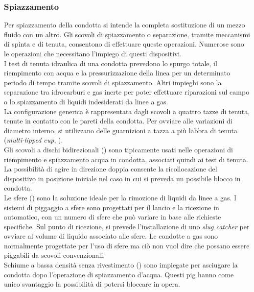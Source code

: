 \subsubsection{Spiazzamento}
Per spiazzamento della condotta si intende la completa sostituzione di un mezzo fluido con un altro. Gli scovoli di spiazzamento o separazione, tramite meccanismi di spinta e di tenuta, consentono di effettuare queste operazioni. Numerose sono le operazioni che necessitano l'impiego di questi dispositivi.\\
I test di tenuta idraulica di una condotta prevedono lo spurgo totale, il riempimento con acqua e la pressurizzazione della linea per un determinato periodo di tempo tramite scovoli di spiazzamento. Altri impieghi sono la separazione tra idrocarburi e gas inerte per poter effettuare riparazioni sul campo o lo spiazzamento di liquidi indesiderati da linee a gas.\\
La configurazione generica è rappresentata dagli scovoli a quattro tazze di tenuta, tenute in contatto con le pareti della condotta. Per ovviare alle variazioni di diametro interno, si utilizzano delle guarnizioni a tazza a più labbra di tenuta (\textit{multi-lipped cup}, ).\\
Gli scovoli a dischi bidirezionali () sono tipicamente usati nelle operazioni di riempimento e spiazzamento acqua in condotta, associati quindi ai test di tenuta. La possibilità di agire in direzione doppia consente la ricollocazione del dispositivo in posizione iniziale nel caso in cui si preveda un possibile blocco in condotta.\\
Le sfere () sono la soluzione ideale per la rimozione di liquidi da linee a gas. I sistemi di piggaggio a sfere sono progettati per il lancio e la ricezione in automatico, con un numero di sfere che può variare in base alle richieste specifiche. Sul punto di ricezione, si prevede l'installazione di uno \textit{slug catcher} per ovviare al volume di liquido associato alle sfere. Le condotte a gas sono normalmente progettate per l'uso di sfere ma ciò non vuol dire che possano essere piggabili da scovoli convenzionali.\\
Schiume a bassa densità senza rivestimento () sono impiegate per asciugare la condotta dopo l'operazione di spiazzamento d'acqua. Questi pig hanno come unico svantaggio la possibilità di potersi bloccare in opera.\\
 
